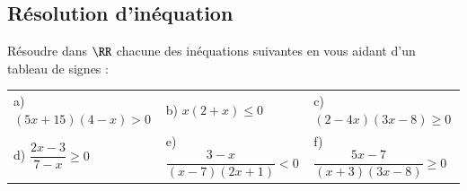 \documentclass[oneside,12pt]{article}          %
\begin{document}
\subsection{Résolution d'inéquation}
Résoudre dans $\RR$ chacune des inéquations suivantes en vous aidant d'un tableau de signes :

\renewcommand{\arraystretch}{2.5}
\begin{tabular}{p{} p{} p{}}
 	a) $(5x+15)(4-x)>0$ & b) $x(2+x)\leq0$ & c) $(2-4x)(3x-8)\geq0$ \\
    d) $\dfrac{2x-3}{7-x} \geq 0$ & e) $\dfrac{3-x}{(x-7)(2x+1)}<0$ & f) $\dfrac{5x-7}{(x+3)(3x-8)}\geq0$
\end{tabular}
\end{document}
